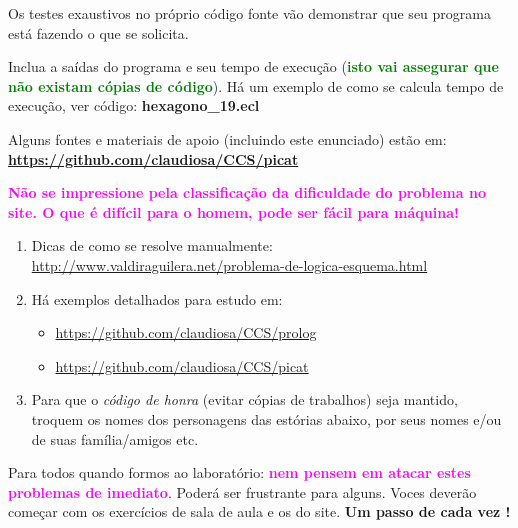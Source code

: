 \documentclass[a4paper,12pt]{article}
\begin{document}
\begin{flushleft}
\vspace{0.5cm}
 Os testes exaustivos no próprio código fonte vão demonstrar que seu programa está fazendo o que se solicita.

\vspace{0.5cm}
 Inclua a saídas do programa e seu tempo de execução (\textbf{\textcolor{green}{isto vai assegurar que não existam cópias de código}}). Há um exemplo de como se calcula tempo de execução, ver código: \textbf{hexagono\_19.ecl}

\vspace{0.5cm}
 Alguns fontes e materiais de apoio (incluindo este enunciado) estão em: \textbf{\url{https://github.com/claudiosa/CCS/picat}} 

\vspace{0.5cm}
 \textbf{\textcolor{magenta}{Não se impressione pela classificação da dificuldade do problema no site. O que é difícil para o homem, pode ser fácil para máquina!}}

\end{flushleft}


\begin{enumerate}
\setlength\itemsep{0.1cm}
\item Dicas de como se resolve manualmente:\\
\url{http://www.valdiraguilera.net/problema-de-logica-esquema.html}

\item Há exemplos detalhados para estudo em:
\begin{itemize}
  \item  \url{https://github.com/claudiosa/CCS/prolog} 
  \item  \url{https://github.com/claudiosa/CCS/picat}
\end{itemize}




\item Para que o \textit{código de honra} (evitar cópias de trabalhos) seja mantido, troquem os nomes dos personagens das estórias abaixo, por seus nomes e/ou de suas família/amigos etc. 

\end{enumerate}

\newpage

\begin{center}

\vskip 2cm
{\Large
Para todos quando formos ao laboratório: \textbf{\textcolor{magenta}{nem pensem em atacar estes problemas de imediato}}. Poderá ser frustrante para alguns. Voces deverão começar com os exercícios de sala de aula e os do site. \textbf{Um passo de cada vez !}
}
\vskip 2cm
\end{center}
\end{document}
